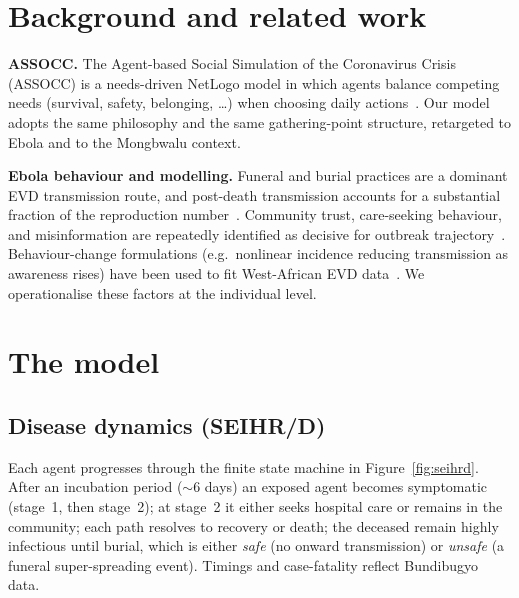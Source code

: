 \documentclass[11pt]{article}
\begin{document}
\section{Background and related work}
\textbf{ASSOCC.} The Agent-based Social Simulation of the Coronavirus Crisis (ASSOCC) is a needs-driven NetLogo model in which agents balance competing needs (survival, safety, belonging, \ldots) when choosing daily actions~\cite{assocc}. Our model adopts the same philosophy and the same gathering-point structure, retargeted to Ebola and to the Mongbwalu context.

\textbf{Ebola behaviour and modelling.} Funeral and burial practices are a dominant EVD transmission route, and post-death transmission accounts for a substantial fraction of the reproduction number~\cite{weitz2015,merler2015}. Community trust, care-seeking behaviour, and misinformation are repeatedly identified as decisive for outbreak trajectory~\cite{funk2015}. Behaviour-change formulations (e.g.\ nonlinear incidence reducing transmission as awareness rises) have been used to fit West-African EVD data~\cite{funk2015}. We operationalise these factors at the individual level.

\section{The model}
\subsection{Disease dynamics (SEIHR/D)}
Each agent progresses through the finite state machine in Figure~\ref{fig:seihrd}. After an incubation period ($\sim$6 days) an exposed agent becomes symptomatic (stage~1, then stage~2); at stage~2 it either seeks hospital care or remains in the community; each path resolves to recovery or death; the deceased remain highly infectious until burial, which is either \emph{safe} (no onward transmission) or \emph{unsafe} (a funeral super-spreading event). Timings and case-fatality reflect Bundibugyo data.
\end{document}
